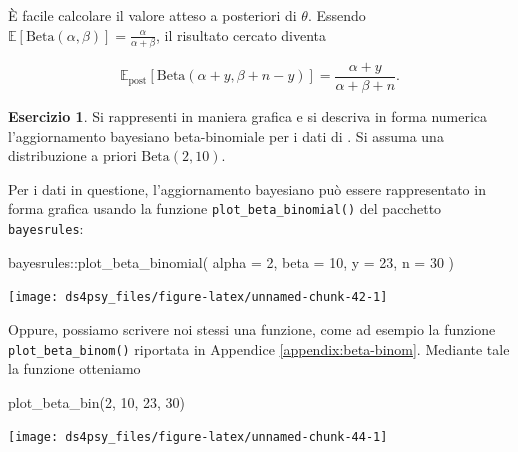 \documentclass[
  11pt,
]{krantz}
\makeatletter
\newenvironment{Shaded}{\begin{snugshade}}{\end{snugshade}}
\newcommand{\AttributeTok}[1]{\textcolor[rgb]{0.61,0.61,0.61}{#1}}
\newcommand{\DecValTok}[1]{\textcolor[rgb]{0.06,0.06,0.06}{#1}}
\newcommand{\FunctionTok}[1]{\textcolor[rgb]{0,0,0}{#1}}
\newcommand{\NormalTok}[1]{#1}
\newcommand{\SpecialCharTok}[1]{\textcolor[rgb]{0,0,0}{#1}}
\newenvironment{kframe}{%
\medskip{}
\setlength{\fboxsep}{.8em}
 \def\at@end@of@kframe{}%
 \ifinner\ifhmode%
  \def\at@end@of@kframe{\end{minipage}}%
  \begin{minipage}{\columnwidth}%
 \fi\fi%
 \def\FrameCommand##1{\hskip\@totalleftmargin \hskip-\fboxsep
 \colorbox{shadecolor}{##1}\hskip-\fboxsep
     \hskip-\linewidth \hskip-\@totalleftmargin \hskip\columnwidth}%
 \MakeFramed {\advance\hsize-\width
   \@totalleftmargin\z@ \linewidth\hsize
   \@setminipage}}%
 {\par\unskip\endMakeFramed%
 \at@end@of@kframe}
\renewenvironment{Shaded}{\begin{kframe}}{\end{kframe}}
\newcommand{\E}{\mathbb{E}} %
\theoremstyle{definition}
\theoremstyle{definition}
\theoremstyle{definition}
\newtheorem{exercise}{Esercizio}[chapter]
\theoremstyle{definition}
\theoremstyle{remark}
\makeatother
\begin{document}
È facile calcolare il valore atteso a posteriori di \(\theta\). Essendo \(\E[\mbox{Beta}(\alpha, \beta)] = \frac{\alpha}{\alpha + \beta}\), il risultato cercato diventa

\begin{equation}
\E_{\text{post}} [\mathrm{Beta}(\alpha + y, \beta + n - y)] = \frac{\alpha + y}{\alpha + \beta +n}.
\label{eq:ev-post-beta-bin-1}
\end{equation}

\begin{exercise}

Si rappresenti in maniera grafica e si descriva in forma numerica l'aggiornamento bayesiano beta-binomiale per i dati di \citet{zetschefuture2019}. Si assuma una distribuzione a priori \(\mbox{Beta}(2, 10)\).

Per i dati in questione, l'aggiornamento bayesiano può essere rappresentato in forma grafica usando la funzione \texttt{plot\_beta\_binomial()} del pacchetto \texttt{bayesrules}:

\begin{Shaded}
\begin{Highlighting}[]
\NormalTok{bayesrules}\SpecialCharTok{::}\FunctionTok{plot\_beta\_binomial}\NormalTok{(}
  \AttributeTok{alpha =} \DecValTok{2}\NormalTok{, }\AttributeTok{beta =} \DecValTok{10}\NormalTok{, }\AttributeTok{y =} \DecValTok{23}\NormalTok{, }\AttributeTok{n =} \DecValTok{30}
\NormalTok{)}
\end{Highlighting}
\end{Shaded}

\begin{center}\texttt{[image: ds4psy\_files/figure-latex/unnamed-chunk-42-1]} \end{center}

Oppure, possiamo scrivere noi stessi una funzione, come ad esempio la funzione \texttt{plot\_beta\_binom()} riportata in Appendice \ref{appendix:beta-binom}. Mediante tale la funzione otteniamo

\begin{Shaded}
\begin{Highlighting}[]
\FunctionTok{plot\_beta\_bin}\NormalTok{(}\DecValTok{2}\NormalTok{, }\DecValTok{10}\NormalTok{, }\DecValTok{23}\NormalTok{, }\DecValTok{30}\NormalTok{)}
\end{Highlighting}
\end{Shaded}

\begin{center}\texttt{[image: ds4psy\_files/figure-latex/unnamed-chunk-44-1]} \end{center}


\end{exercise}
\end{document}
